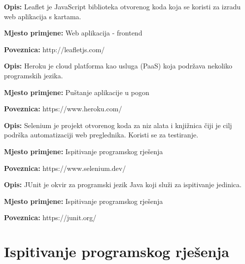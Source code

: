 			\noindent {}
			\begin{packed_item}
				\item  \textbf{Opis:} Leaflet je JavaScript biblioteka otvorenog koda koja se koristi za izradu web aplikacija s kartama.
				\item  \textbf{Mjesto primjene:} Web aplikacija - frontend
				\item  \textbf{Poveznica:} http://leafletjs.com/
			\end{packed_item}
		
			\noindent {}
			\begin{packed_item}
				\item  \textbf{Opis:} Heroku je cloud platforma kao usluga (PaaS) koja podržava nekoliko programskih jezika.
				\item  \textbf{Mjesto primjene:} Puštanje aplikacije u pogon
				\item  \textbf{Poveznica:} https://www.heroku.com/
			\end{packed_item}
			
			\noindent {}
			\begin{packed_item}
				\item  \textbf{Opis:} Selenium je projekt otvorenog koda za niz alata i knjižnica čiji je cilj podrška automatizaciji web preglednika. Koristi se za testiranje.
				\item  \textbf{Mjesto primjene:} Ispitivanje programskog rješenja
				\item  \textbf{Poveznica:} https://www.selenium.dev/
			\end{packed_item}
			
			\noindent {}
			\begin{packed_item}
				\item  \textbf{Opis:} JUnit je okvir za programski jezik Java koji služi za ispitivanje jedinica.
				\item  \textbf{Mjesto primjene:} Ispitivanje programskog rješenja
				\item  \textbf{Poveznica:} https://junit.org/
			\end{packed_item}
			\eject 
		
	
		\section{Ispitivanje programskog rješenja}
			
